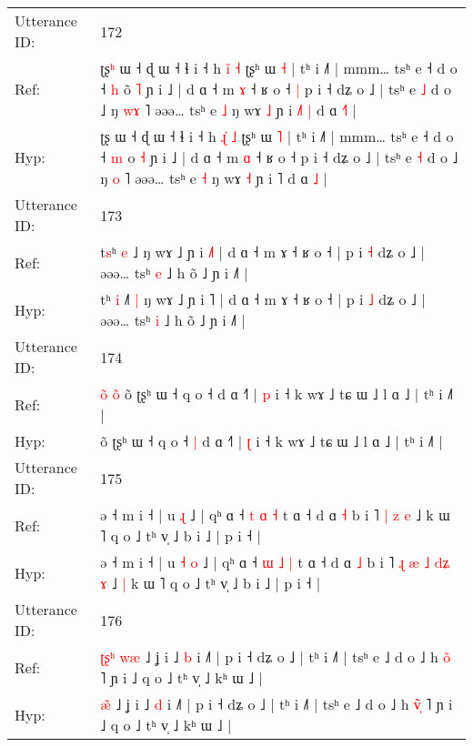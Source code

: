 \documentclass[10pt]{article}
\DeclareRobustCommand{\hl}[1]{{\textcolor{red}{#1}}}
\begin{document}
\begin{longtable}{ll}
 \\
\midrule
Utterance ID: & 172 \\
Ref: & ʈʂ\hl{ʰ} ɯ ˧ ɖ ɯ ˧ ɬ i ˧ h \hl{i}\hl{̃} \hl{˧} ʈʂʰ ɯ \hl{˧} | tʰ i ˩˥ | mmm… tsʰ e ˧ d o ˧ \hl{h} o\hl{̃} \hl{˥} ɲ i ˩ | d ɑ ˧ m \hl{ɤ} ˧ ʁ o ˧\hl{ }\hl{|} p i ˧ dʑ o ˩ | tsʰ e \hl{˩} d o ˩ ŋ \hl{w}\hl{ɤ} ˥ əəə… tsʰ e \hl{˩} ŋ wɤ \hl{˩} ɲ i \hl{˩}˥\hl{ }\hl{|} d ɑ \hl{˧}\hl{˥} |
 \\
Hyp: & ʈʂ\hl{} ɯ ˧ ɖ ɯ ˧ ɬ i ˧ h \hl{ɻ}\hl{̍} \hl{˩} ʈʂʰ ɯ \hl{˥} | tʰ i ˩˥ | mmm… tsʰ e ˧ d o ˧ \hl{m} o\hl{} \hl{˧} ɲ i ˩ | d ɑ ˧ m \hl{ɑ} ˧ ʁ o ˧\hl{}\hl{} p i ˧ dʑ o ˩ | tsʰ e \hl{˧} d o ˩ ŋ \hl{}\hl{o} ˥ əəə… tsʰ e \hl{˧} ŋ wɤ \hl{˧} ɲ i \hl{}˥\hl{}\hl{} d ɑ \hl{}\hl{˩} |
 \\
\midrule
Utterance ID: & 173 \\
Ref: & t\hl{s}ʰ \hl{e} ˩\hl{}\hl{}\hl{} ŋ wɤ ˩ ɲ i \hl{˩}˥ | d ɑ ˧ m ɤ ˧ ʁ o ˧ | p i \hl{˧} dʑ o ˩ | əəə… tsʰ \hl{e} ˩ h õ ˩ ɲ i ˩˥ |
 \\
Hyp: & t\hl{}ʰ \hl{i} ˩\hl{˥}\hl{ }\hl{|} ŋ wɤ ˩ ɲ i \hl{}˥ | d ɑ ˧ m ɤ ˧ ʁ o ˧ | p i \hl{˩} dʑ o ˩ | əəə… tsʰ \hl{i} ˩ h õ ˩ ɲ i ˩˥ |
 \\
\midrule
Utterance ID: & 174 \\
Ref: & \hl{o}\hl{̃}\hl{ }\hl{o}\hl{̃}\hl{ }õ ʈʂʰ ɯ ˧ q o ˧\hl{}\hl{} d ɑ ˧˥ | \hl{p} i ˧ k wɤ ˩ tɕ ɯ ˩ l ɑ ˩ | tʰ i ˩˥ |
 \\
Hyp: & \hl{}\hl{}\hl{}\hl{}\hl{}\hl{}õ ʈʂʰ ɯ ˧ q o ˧\hl{ }\hl{|} d ɑ ˧˥ | \hl{ʈ} i ˧ k wɤ ˩ tɕ ɯ ˩ l ɑ ˩ | tʰ i ˩˥ |
 \\
\midrule
Utterance ID: & 175 \\
Ref: & ə ˧ m i ˧ | u\hl{}\hl{} \hl{ɻ} ˩ | qʰ ɑ ˧ \hl{t} \hl{ɑ} \hl{˧} t ɑ ˧ d ɑ \hl{˧} b i ˥\hl{}\hl{}\hl{}\hl{} \hl{|} \hl{}\hl{z} \hl{e} ˩\hl{}\hl{} k ɯ ˥ q o ˩ tʰ v̩ ˩ b i ˩ | p i ˧ |
 \\
Hyp: & ə ˧ m i ˧ | u\hl{ }\hl{˧} \hl{o} ˩ | qʰ ɑ ˧ \hl{ɯ} \hl{˩} \hl{|} t ɑ ˧ d ɑ \hl{˩} b i ˥\hl{ }\hl{ɻ}\hl{ }\hl{æ} \hl{˩} \hl{d}\hl{ʑ} \hl{ɤ} ˩\hl{ }\hl{|} k ɯ ˥ q o ˩ tʰ v̩ ˩ b i ˩ | p i ˧ |
 \\
\midrule
Utterance ID: & 176 \\
Ref: & \hl{ʈ}\hl{ʂ}\hl{ʰ}\hl{ }\hl{w}\hl{æ} ˩ ʝ i ˩ \hl{b} i ˩˥ | p i ˧ dʑ o ˩ | tʰ i ˩˥ | tsʰ e ˩ d o ˩ h \hl{o}̃\hl{} ˥ ɲ i ˩ q o ˩ tʰ v̩ ˩ kʰ ɯ ˩ |
 \\
Hyp: & \hl{}\hl{}\hl{}\hl{}\hl{æ}\hl{̃} ˩ ʝ i ˩ \hl{d} i ˩˥ | p i ˧ dʑ o ˩ | tʰ i ˩˥ | tsʰ e ˩ d o ˩ h \hl{v}̃\hl{̩} ˥ ɲ i ˩ q o ˩ tʰ v̩ ˩ kʰ ɯ ˩ |
 \\

\end{longtable}
\end{document}
